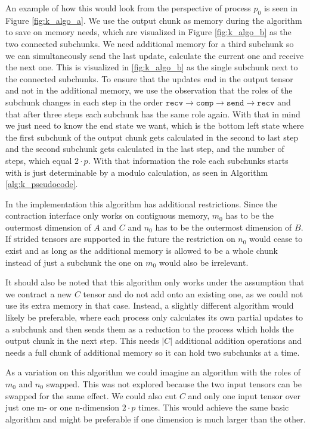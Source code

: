 An example of how this would look from the perspective of process $p_0$ is seen in Figure \ref{fig:k_algo_a}.
We use the output chunk as memory during the algorithm to save on memory needs, which are visualized in Figure \ref{fig:k_algo_b} as the two connected subchunks.
We need additional memory for a third subchunk so we can simultaneously send the last update, calculate the current one and receive the next one.
This is visualized in \ref{fig:k_algo_b} as the single subchunk next to the connected subchunks.
To ensure that the updates end in the output tensor and not in the additional memory, we use the observation that the roles of the subchunk changes in each step in the order $\texttt{recv} \rightarrow \texttt{comp} \rightarrow \texttt{send} \rightarrow \texttt{recv}$ and that after three steps each subchunk has the same role again.
With that in mind we just need to know the end state we want, which is the bottom left state where the first subchunk of the output chunk gets calculated in the second to last step and the second subchunk gets calculated in the last step, and the number of steps, which equal $2 \cdot p$.
With that information the role each subchunks starts with is just determinable by a modulo calculation, as seen in Algorithm \ref{alg:k_pseudocode}.

In the implementation this algorithm has additional restrictions.
Since the contraction interface only works on contiguous memory, $m_0$ has to be the outermost dimension of $A$ and $C$ and $n_0$ has to be the outermost dimension of $B$.
If strided tensors are supported in the future the restriction on $n_0$ would cease to exist and as long as the additional memory is allowed to be a whole chunk instead of just a subchunk the one on $m_0$ would also be irrelevant.

It should also be noted that this algorithm only works under the assumption that we contract a new $C$ tensor and do not add onto an existing one, as we could not use its extra memory in that case.
Instead, a slightly different algorithm would likely be preferable, where each process only calculates its own partial updates to a subchunk and then sends them as a reduction to the process which holds the output chunk in the next step.
This needs $|C|$ additional addition operations and needs a full chunk of additional memory so it can hold two subchunks at a time.

As a variation on this algorithm we could imagine an algorithm with the roles of $m_0$ and $n_0$ swapped.
This was not explored because the two input tensors can be swapped for the same effect.
We could also cut $C$ and only one input tensor over just one m- or one n-dimension $2 \cdot p$ times.
This would achieve the same basic algorithm and might be preferable if one dimension is much larger than the other.
